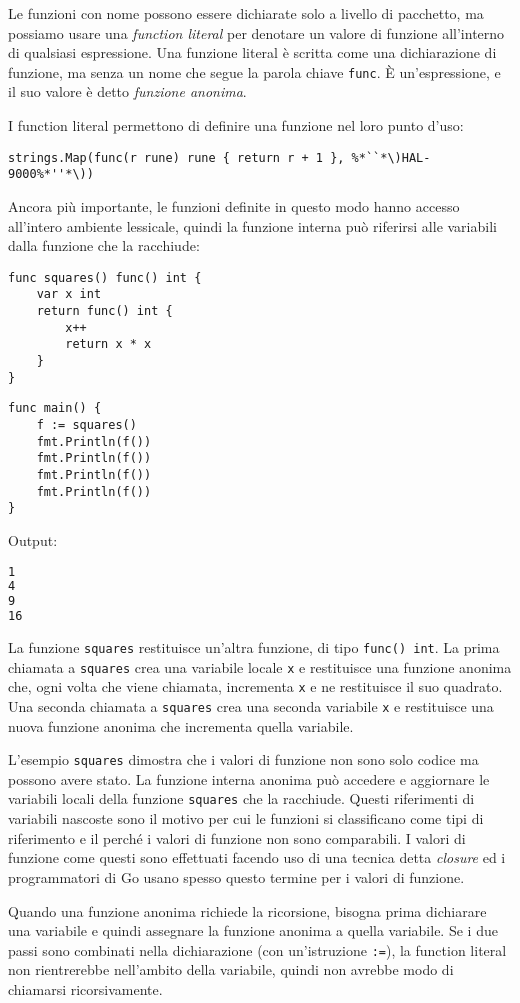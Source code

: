 Le funzioni con nome possono essere dichiarate solo a livello di pacchetto, ma possiamo usare una \textit{function literal} per denotare un valore di funzione all'interno di qualsiasi espressione.
Una funzione literal è scritta come una dichiarazione di funzione, ma senza un nome che segue la parola chiave \verb|func|.
È un'espressione, e il suo valore è detto \textit{funzione anonima}.

I function literal permettono di definire una funzione nel loro punto d'uso:
\begin{lstlisting}[frame=single, label={lst:lstlisting4-6.1}]
strings.Map(func(r rune) rune { return r + 1 }, %*``*\)HAL-9000%*''*\))
\end{lstlisting}
Ancora più importante, le funzioni definite in questo modo hanno accesso all'intero ambiente lessicale, quindi la funzione interna può riferirsi alle variabili dalla funzione che la racchiude:
\begin{lstlisting}[frame=single, label={lst:lstlisting4-6.2}]
func squares() func() int {
    var x int
    return func() int {
        x++
        return x * x
    }
}
\end{lstlisting}
\begin{lstlisting}[frame=single, label={lst:lstlisting4-6.3}]
func main() {
    f := squares()
    fmt.Println(f())
    fmt.Println(f())
    fmt.Println(f())
    fmt.Println(f())
}
\end{lstlisting}
Output:
\begin{lstlisting}[language=bash, frame=L, label={lst:lstlisting4-6.4}]
1
4
9
16
\end{lstlisting}
La funzione \verb|squares| restituisce un'altra funzione, di tipo \verb|func() int|.
La prima chiamata a \verb|squares| crea una variabile locale \verb|x| e restituisce una funzione anonima che, ogni volta che viene chiamata, incrementa \verb|x| e ne restituisce il suo quadrato.
Una seconda chiamata a \verb|squares| crea una seconda variabile \verb|x| e restituisce una nuova funzione anonima che incrementa quella variabile.

L'esempio \verb|squares| dimostra che i valori di funzione non sono solo codice ma possono avere stato.
La funzione interna anonima può accedere e aggiornare le variabili locali della funzione \verb|squares| che la racchiude.
Questi riferimenti di variabili nascoste sono il motivo per cui le funzioni si classificano come tipi di riferimento e il perché i valori di funzione non sono comparabili.
I valori di funzione come questi sono effettuati facendo uso di una tecnica detta \textit{closure} ed i programmatori di Go usano spesso questo termine per i valori di funzione.

Quando una funzione anonima richiede la ricorsione, bisogna prima dichiarare una variabile e quindi assegnare la funzione anonima a quella variabile.
Se i due passi sono combinati nella dichiarazione (con un'istruzione \verb|:=|), la function literal non rientrerebbe nell'ambito della variabile, quindi non avrebbe modo di chiamarsi ricorsivamente.